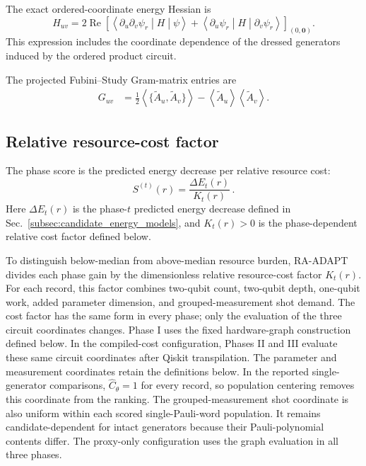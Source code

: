 \documentclass[
  reprint,
  amsmath,
  amssymb,
  aps,
  pra,
  nofootinbib,
  superscriptaddress,
  floatfix
]{revtex4-2}
\begin{document}
The exact ordered-coordinate energy Hessian is
\begin{equation}
H_{uv}
=
2\operatorname{Re}\!\left[
\left\langle
\partial_u\partial_v\psi_r
\middle|H\middle|\psi
\right\rangle
+
\left\langle
\partial_u\psi_r
\middle|H\middle|
\partial_v\psi_r
\right\rangle
\right]_{(0,\mathbf0)} .
\label{eq:joint_hessian_observable}
\end{equation}
This expression includes the coordinate dependence of the dressed generators
induced by the ordered product circuit.

The projected Fubini--Study Gram-matrix entries are
\begin{equation}
\begin{aligned}
G_{uv}
&=\frac12\left\langle
\{\widetilde A_u,\widetilde A_v\}
\right\rangle
-\left\langle\widetilde A_u\right\rangle
 \left\langle\widetilde A_v\right\rangle .
\end{aligned}
\label{eq:joint_gram_observable}
\end{equation}

\subsection{Relative resource-cost factor}
\label{subsec:cost_weighted_record_ranking}
%
The phase score is the predicted energy decrease per relative resource cost:
\begin{equation}
S^{(t)}(r)
=
\frac{\Delta E_t(r)}{K_t(r)}\,.
\label{eq:master_phase_score}
\end{equation}
Here \(\Delta E_t(r)\) is the phase-\(t\) predicted energy decrease defined in
Sec.~\ref{subsec:candidate_energy_models}, and \(K_t(r)>0\) is the
phase-dependent relative cost factor defined below.

To distinguish below-median from above-median resource burden, \textsc{RA-ADAPT}
divides each phase gain by the dimensionless relative resource-cost factor
\(K_t(r)\). For each record, this factor combines two-qubit count,
two-qubit depth, one-qubit work, added parameter dimension, and
grouped-measurement shot demand. The cost factor has the same form in every
phase; only the evaluation of the three circuit coordinates changes. Phase I
uses the fixed hardware-graph construction defined below. In the compiled-cost
configuration, Phases II and III evaluate these same circuit coordinates after
Qiskit transpilation. The parameter and measurement coordinates retain the
definitions below. In the reported single-generator comparisons,
\(\widehat C_\theta=1\) for every record, so population centering removes this
coordinate from the ranking. The grouped-measurement shot coordinate is also
uniform within each scored single-Pauli-word population. It remains
candidate-dependent for intact generators because their Pauli-polynomial
contents differ. The proxy-only configuration uses the graph evaluation in all
three phases.
\end{document}

